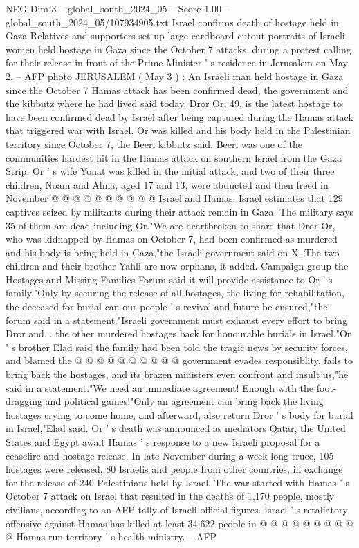 \begin{textsample}{NEG Dim 3 – global\_south\_2024\_05 – Score 1.00 – global\_south\_2024\_05/107934905.txt}  \label{ex:f3_neg_353}
Israel confirms death of hostage held in Gaza Relatives and supporters set up large cardboard cutout portraits of Israeli women held hostage in Gaza since the October 7 attacks, during a protest calling for their release in front of the Prime Minister ' s residence in Jerusalem on May 2. -- AFP photo JERUSALEM ( May 3 ) : An Israeli man held hostage in Gaza since the October 7 Hamas attack has been confirmed dead, the government and the kibbutz where he had lived said today.
Dror Or, 49, is the latest hostage to have been confirmed dead by Israel after being captured during the Hamas attack that triggered war with Israel.
Or was killed and his body held in the Palestinian territory since October 7, the Beeri kibbutz said.
Beeri was one of the communities hardest hit in the Hamas attack on southern Israel from the Gaza Strip.
Or ' s wife Yonat was killed in the initial attack, and two of their three children, Noam and Alma, aged 17 and 13, were abducted and then freed in November @ @ @ @ @ @ @ @ @ @ Israel and Hamas.
Israel estimates that 129 captives seized by militants during their attack remain in Gaza.
The military says 35 of them are dead including Or."We are heartbroken to share that Dror Or, who was kidnapped by Hamas on October 7, had been confirmed as murdered and his body is being held in Gaza,"the Israeli government said on X.
The two children and their brother Yahli are now orphans, it added.
Campaign group the Hostages and Missing Families Forum said it will provide assistance to Or ' s family."Only by securing the release of all hostages, the living for rehabilitation, the deceased for burial can our people ' s revival and future be ensured,"the forum said in a statement."Israeli government must exhaust every effort to bring Dror and... the other murdered hostages back for honourable burials in Israel."Or ' s brother Elad said the family had been told the tragic news by security forces, and blamed the @ @ @ @ @ @ @ @ @ @ government evades responsiblity, fails to bring back the hostages, and its brazen ministers even confront and insult us,"he said in a statement."We need an immediate agreement!
Enough with the foot-dragging and political games!"Only an agreement can bring back the living hostages crying to come home, and afterward, also return Dror ' s body for burial in Israel,"Elad said.
Or ' s death was announced as mediators Qatar, the United States and Egypt await Hamas ' s response to a new Israeli proposal for a ceasefire and hostage release.
In late November during a week-long truce, 105 hostages were released, 80 Israelis and people from other countries, in exchange for the release of 240 Palestinians held by Israel.
The war started with Hamas ' s October 7 attack on Israel that resulted in the deaths of 1,170 people, mostly civilians, according to an AFP tally of Israeli official figures.
Israel ' s retaliatory offensive against Hamas has killed at least 34,622 people in @ @ @ @ @ @ @ @ @ @ Hamas-run territory ' s health ministry. -- AFP

\end{textsample}
